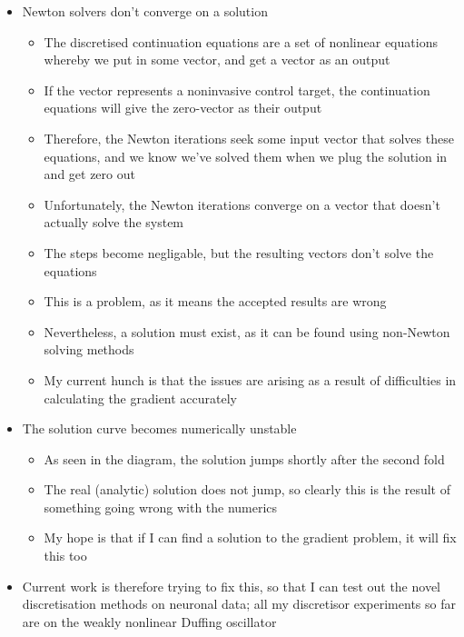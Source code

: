 \documentclass[11pt]{article}
\begin{document}
\begin{itemize}
\item Newton solvers don't converge on a solution
\begin{itemize}
\item The discretised continuation equations are a set of nonlinear equations whereby we put in some vector, and get a vector as an output
\item If the vector represents a noninvasive control target, the continuation equations will give the zero-vector as their output
\item Therefore, the Newton iterations seek some input vector that solves these equations, and we know we've solved them when we plug the solution in and get zero out
\item Unfortunately, the Newton iterations converge on a vector that doesn't actually solve the system
\item The steps become negligable, but the resulting vectors don't solve the equations
\item This is a problem, as it means the accepted results are wrong
\item Nevertheless, a solution must exist, as it can be found using non-Newton solving methods
\item My current hunch is that the issues are arising as a result of difficulties in calculating the gradient accurately
\end{itemize}

\item The solution curve becomes numerically unstable
\begin{itemize}
\item As seen in the diagram, the solution jumps shortly after the second fold
\item The real (analytic) solution does not jump, so clearly this is the result of something going wrong with the numerics
\item My hope is that if I can find a solution to the gradient problem, it will fix this too
\end{itemize}

\item Current work is therefore trying to fix this, so that I can test out the novel discretisation methods on neuronal data; all my discretisor experiments so far are on the weakly nonlinear Duffing oscillator
\end{itemize}
\end{document}
